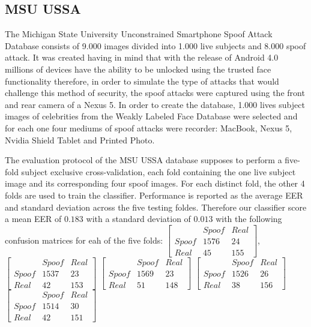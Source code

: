 \subsection{MSU USSA}
The Michigan State University Unconstrained Smartphone Spoof Attack Database consists of 9.000 images divided into 1.000 live subjects and 8.000 spoof attack. It was created having in mind that with the release of Android 4.0 millions of devices have the ability to be unlocked using the trusted face functionality therefore, in order to simulate the type of attacks that would challenge this method of security, the spoof attacks were captured using the front and rear camera of a Nexus 5. In order to create the database, 1.000 lives subject images of celebrities from the Weakly Labeled Face Database were selected and for each one four mediums of spoof attacks were recorder: MacBook, Nexus 5, Nvidia Shield Tablet and Printed Photo. 

The evaluation protocol of the MSU USSA database supposes to perform a five-fold subject exclusive cross-validation, each fold containing the one live subject image and its corresponding four spoof images. For each distinct fold, the other 4 folds are used to train the classifier. Performance is reported as the average EER and standard deviation across the five testing foldes. Therefore our classifier score a mean EER of $0.183$ with a standard deviation of $0.013$ with the following confusion matrices for eah of the five folds:
$
[
\begin{smallmatrix}
&Spoof & Real\\
Spoof & 1576 & 24\\
Real & 45 & 155
\end{smallmatrix}]
$, 
$
[
\begin{smallmatrix}
&Spoof & Real\\
Spoof & 1537 & 23\\
Real & 42 & 153
\end{smallmatrix}]
$
$
[
\begin{smallmatrix}
&Spoof & Real\\
Spoof & 1569 & 23\\
Real & 51 & 148
\end{smallmatrix}] 
$
$
[
\begin{smallmatrix}
&Spoof & Real\\
Spoof & 1526 & 26\\
Real & 38 & 156
\end{smallmatrix}] 
$
$
[
\begin{smallmatrix}
&Spoof & Real\\
Spoof & 1514 & 30\\
Real & 42 & 151
\end{smallmatrix}] 
$



